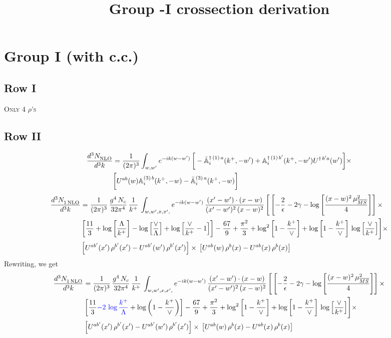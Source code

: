 \documentclass[9pt]{article}
\title{Group -I crossection derivation}
\author{}
\date{}
\def\mf#1{\mathbb{#1}}
\numberwithin{equation}{section}
\begin{document}
\section{Group I (with c.c.)}
\subsection{Row I\,}
\textsc{Only 4 $\rho$'s}
\subsection{Row II}
\begin{align}
    \frac{d^{3}N_{\rm NLO}^{\rm}}{d^{3}k} &  = \frac{1}{(2\pi)^{3}}  \int_{w, w^\prime} e^{-ik(w-w^\prime)}\,\bigg[-\bar{\mf{A}}^{\dagger\,(1)\,a}_{i}(k^{+},-w^{\prime})+\mf{A}^{\dagger\, (1)\, b^{\prime}}_{i}(k^{+},-w^{\prime})U^{\dagger\, b^{\prime}a}(w^{\prime})\bigg]\times \notag \\ & \bigg[U^{ab}(w)\mf{A}^{(3)\, b}_{i}(k^{+},- w)-\Bar{\mf{A}}^{(3)\, a}_{i}(k^{+}, - w)\bigg]\nonumber
\end{align}
\begin{align}
     \frac{d^{3}N_{1\,\rm NLO}^{\rm}}{d^{3}k} &  = \frac{1}{(2\pi)^{3}}\, \frac{g^{4}\,N_{c}}{32\pi^{4}}\,\frac{1}{k^{+}}\, \int_{w, w',x,x',} e^{-ik(w-w^\prime)}\, \frac{(x'-w')\cdot (x-w)}{(x'-w')^{2}\, (x-w)^{2}}\, \Bigg[\left[-\frac{2}{\epsilon}-2\gamma-\log{\left[\frac{(x-w)^{2}\,\mu^{2}_{\overline{MS}}}{4}\right]}\right]\times \notag \\ & \left[\frac{11}{3}+\log{\left[\frac{\Lambda}{k^{+}}\right]}-\log{\left[\frac{\vee}{\Lambda}\right]}+\log{\left[\frac{\vee}{k^{+}}-1\right]}\right]-\frac{67}{9}+\frac{\pi^{2}}{3}+\log^{2}{\left[1-\frac{k^{+}}{\vee}\right]}+\log{\left[1-\frac{k^{+}}{\vee}\right]}\,\log{\left[\frac{\vee}{k^{+}}\right]}\Bigg]\times\notag \\ & \left[U^{ab'}(x')\,\rho^{b'}(x') - U^{ab'}(w')\,\rho^{b'}(x')\right]\times\,\left[U^{ab}(w)\,\rho^{b}(x) - U^{ab}(x)\,\rho^{b}(x)\right]
\end{align}
Rewriting, we get
\begin{align}
     \frac{d^{3}N_{1\,\rm NLO}^{\rm}}{d^{3}k} &  = \frac{1}{(2\pi)^{3}}\, \frac{g^{4}\,N_{c}}{32\pi^{4}}\,\frac{1}{k^{+}}\, \int_{w, w',x,x',} e^{-ik(w-w^\prime)}\, \frac{(x'-w')\cdot (x-w)}{(x'-w')^{2}\, (x-w)^{2}}\, \Bigg[\left[-\frac{2}{\epsilon}-2\gamma-\log{\left[\frac{(x-w)^{2}\,\mu^{2}_{\overline{MS}}}{4}\right]}\right]\times \notag \\ & \left[\frac{11}{3}{\color{blue}-2\,\log\frac{k^{+}}{\Lambda}}+\log{\left(1-\frac{k^{+}}{\vee}\right)}\right]-\frac{67}{9}+\frac{\pi^{2}}{3}+\log^{2}{\left[1-\frac{k^{+}}{\vee}\right]}+\log{\left[1-\frac{k^{+}}{\vee}\right]}\,\log{\left[\frac{\vee}{k^{+}}\right]}\Bigg]\times\notag \\ & \left[U^{ab'}(x')\,\rho^{b'}(x') - U^{ab'}(w')\,\rho^{b'}(x')\right]\times\,\left[U^{ab}(w)\,\rho^{b}(x) - U^{ab}(x)\,\rho^{b}(x)\right]
\end{align}
\end{document}
